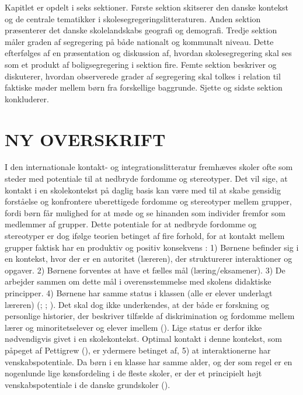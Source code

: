\documentclass[
]{book}
\begin{document}
Kapitlet er opdelt i seks sektioner. Første sektion skitserer den danske kontekst og de centrale tematikker i skolesegregeringslitteraturen. Anden sektion præsenterer det danske skolelandskabs geografi og demografi. Tredje sektion måler graden af segregering på både nationalt og kommunalt niveau. Dette efterfølges af en præsentation og diskussion af, hvordan skolesegregering skal ses som et produkt af boligsegregering i sektion fire. Femte sektion beskriver og diskuterer, hvordan observerede grader af segregering skal tolkes i relation til faktiske møder mellem børn fra forskellige baggrunde. Sjette og sidste sektion konkluderer.

\section{NY OVERSKRIFT}\label{ny-overskrift}

I den internationale kontakt- og integrationslitteratur fremhæves skoler ofte som steder med potentiale til at nedbryde fordomme og stereotyper. Det vil sige, at kontakt i en skolekontekst på daglig basis kan være med til at skabe gensidig forståelse og konfrontere uberettigede fordomme og stereotyper mellem grupper, fordi børn får mulighed for at møde og se hinanden som individer fremfor som medlemmer af grupper. Dette potentiale for at nedbryde fordomme og stereotyper er dog ifølge teorien betinget af fire forhold, for at kontakt mellem grupper faktisk har en produktiv og positiv konsekvens : 1) Børnene befinder sig i en kontekst, hvor der er en autoritet (læreren), der strukturerer interaktioner og opgaver. 2) Børnene forventes at have et fælles mål (læring/eksamener). 3) De arbejder sammen om dette mål i overensstemmelse med skolens didaktiske principper. 4) Børnene har samme status i klassen (alle er elever underlagt læreren) (; ; ). Det skal dog ikke underkendes, at der både er forskning og personlige historier, der beskriver tilfælde af diskrimination og fordomme mellem lærer og minoritetselever og elever imellem (). Lige status er derfor ikke nødvendigvis givet i en skolekontekst. Optimal kontakt i denne kontekst, som påpeget af Pettigrew (), er ydermere betinget af, 5) at interaktionerne har venskabspotentiale. Da børn i en klasse har samme alder, og der som regel er en nogenlunde lige kønsfordeling i de fleste skoler, er der et principielt højt venskabspotentiale i de danske grundskoler ().
\end{document}
